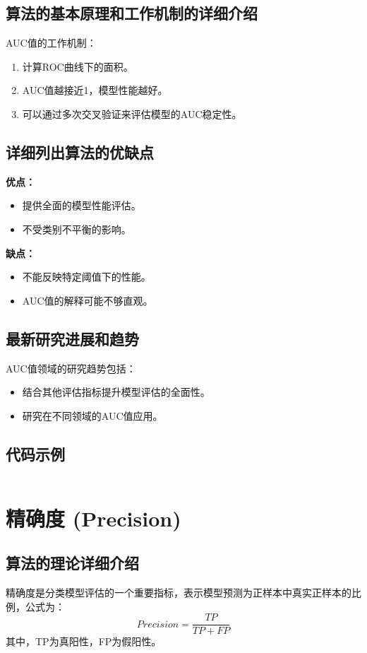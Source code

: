 \subsection*{算法的基本原理和工作机制的详细介绍}
AUC值的工作机制：
\begin{enumerate}
    \item 计算ROC曲线下的面积。
    \item AUC值越接近1，模型性能越好。
    \item 可以通过多次交叉验证来评估模型的AUC稳定性。
\end{enumerate}

\subsection*{详细列出算法的优缺点}
\textbf{优点：}
\begin{itemize}
    \item 提供全面的模型性能评估。
    \item 不受类别不平衡的影响。
\end{itemize}

\textbf{缺点：}
\begin{itemize}
    \item 不能反映特定阈值下的性能。
    \item AUC值的解释可能不够直观。
\end{itemize}

\subsection*{最新研究进展和趋势}
AUC值领域的研究趋势包括：
\begin{itemize}
    \item 结合其他评估指标提升模型评估的全面性。
    \item 研究在不同领域的AUC值应用。
\end{itemize}
\subsection*{代码示例}
\begin{lstlisting}

\end{lstlisting}


\section{精确度 (Precision)}
\subsection*{算法的理论详细介绍}
精确度是分类模型评估的一个重要指标，表示模型预测为正样本中真实正样本的比例，公式为：
\[
    Precision = \frac{TP}{TP + FP}
\]
其中，TP为真阳性，FP为假阳性。

